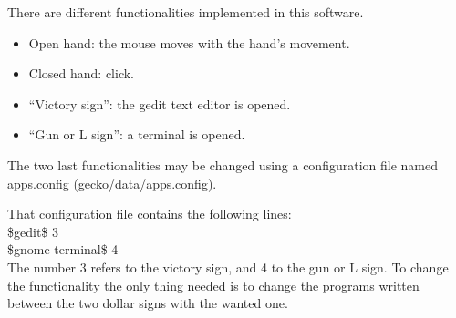 There are different functionalities implemented in this software. 
\begin{itemize}
\item Open hand: the mouse moves with the hand's movement.
\item Closed hand: click.
\item ``Victory sign'': the gedit text editor is opened.
\item ``Gun or L sign'': a terminal is opened. 
\end{itemize}

The two last functionalities may be changed using a configuration file named apps.config (gecko/data/apps.config). 

That configuration file contains the following lines:
\\[0.5cm]
\$gedit\$ 3 \\
\$gnome-terminal\$ 4
\\[0.5cm]

The number 3 refers to the victory sign, and  4 to the gun or L sign. To change the functionality the only thing needed is to change the programs written between the two dollar signs with the wanted one. 

\newpage
